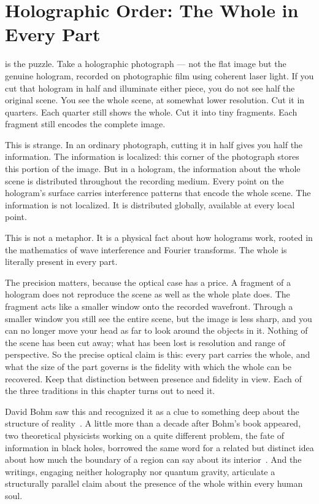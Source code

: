 \chapter{Holographic Order: The Whole in Every Part}
\label{ch:holographic-order}


 is the puzzle.
Take a holographic photograph --- not the flat image but the genuine hologram, recorded on photographic film using coherent laser light.
If you cut that hologram in half and illuminate either piece, you do not see half the original scene.
You see the whole scene, at somewhat lower resolution.
Cut it in quarters.
Each quarter still shows the whole.
Cut it into tiny fragments.
Each fragment still encodes the complete image.

This is strange.
In an ordinary photograph, cutting it in half gives you half the information.
The information is localized: this corner of the photograph stores this portion of the image.
But in a hologram, the information about the whole scene is distributed throughout the recording medium.
Every point on the hologram's surface carries interference patterns that encode the whole scene.
The information is not localized.
It is distributed globally, available at every local point.

This is not a metaphor.
It is a physical fact about how holograms work, rooted in the mathematics of wave interference and Fourier transforms.
The whole is literally present in every part.

The precision matters, because the optical case has a price.
A fragment of a hologram does not reproduce the scene as well as the whole plate does.
The fragment acts like a smaller window onto the recorded wavefront.
Through a smaller window you still see the entire scene, but the image is less sharp, and you can no longer move your head as far to look around the objects in it.
Nothing of the scene has been cut away; what has been lost is resolution and range of perspective.
So the precise optical claim is this: every part carries the whole, and what the size of the part governs is the fidelity with which the whole can be recovered.
Keep that distinction between presence and fidelity in view.
Each of the three traditions in this chapter turns out to need it.

David Bohm saw this and recognized it as a clue to something deep about the structure of reality~\citep{Bohm1980}.
A little more than a decade after Bohm's book appeared, two theoretical physicists working on a quite different problem, the fate of information in black holes, borrowed the same word for a related but distinct idea about how much the boundary of a region can say about its interior~\citep{tHooft1993,Susskind1995}.
And the \bahai writings, engaging neither holography nor quantum gravity, articulate a structurally parallel claim about the presence of the whole within every human soul.

